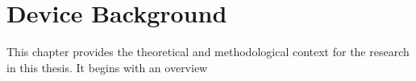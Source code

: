 \chapter{Device Background}\label{cha:device_background}


    This chapter provides the theoretical and methodological context for the research in this thesis. 
    It begins with an overview  